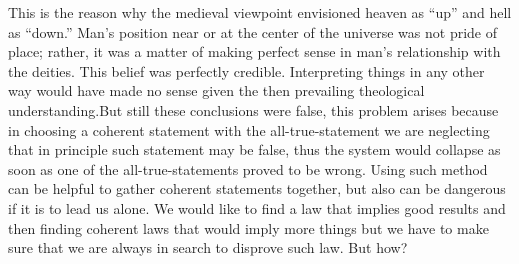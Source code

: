 \documentclass[9pt,a4paper,twocolumn]{article}
\newcounter{theo}
\begin{document}
            This is the reason why the medieval viewpoint envisioned heaven as “up” and hell as “down.” Man’s position near or at the center of the universe was not pride of place; rather, it was a matter of making perfect sense in man’s relationship with the deities. This belief was perfectly credible. Interpreting things in any other way would have made no sense given the then prevailing theological understanding.But still these conclusions were false, this problem arises because in choosing a coherent statement with the all-true-statement we are neglecting that in principle such statement may be false, thus the system would collapse as soon as one of the all-true-statements proved to be wrong. Using such method can be helpful to gather coherent statements together, but also can be dangerous if it is to lead us alone. We would like to find a law that implies good results and then finding coherent laws that would imply more things but we have to make sure that we are always in search to disprove such law. But how?
            
\end{document}
